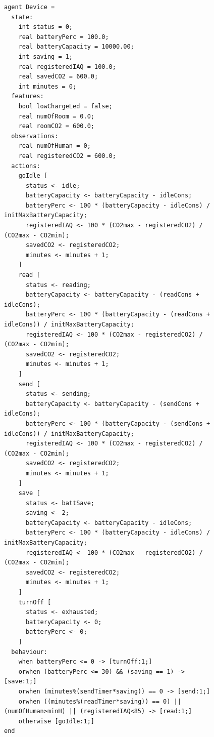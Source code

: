 \documentclass[runningheads]{llncs}
\begin{document}
\begin{figure}[htbp!]
\begin{lstlisting}[language=yoda,basicstyle=\scriptsize, caption={IAQ Scenario: \textsf{Device} agent}, label={lst:deviceagent}]
agent Device =
  state:
    int status = 0;
    real batteryPerc = 100.0;
    real batteryCapacity = 10000.00;
    int saving = 1;
    real registeredIAQ = 100.0;
    real savedCO2 = 600.0;
    int minutes = 0;
  features:
    bool lowChargeLed = false;
    real numOfRoom = 0.0;               
    real roomCO2 = 600.0;
  observations:
    real numOfHuman = 0;     
    real registeredCO2 = 600.0;    
  actions:
    goIdle [
      status <- idle;
      batteryCapacity <- batteryCapacity - idleCons;
      batteryPerc <- 100 * (batteryCapacity - idleCons) / initMaxBatteryCapacity;
      registeredIAQ <- 100 * (CO2max - registeredCO2) / (CO2max - CO2min);
      savedCO2 <- registeredCO2;
      minutes <- minutes + 1;
    ]
    read [
      status <- reading;
      batteryCapacity <- batteryCapacity - (readCons + idleCons);
      batteryPerc <- 100 * (batteryCapacity - (readCons + idleCons)) / initMaxBatteryCapacity;
      registeredIAQ <- 100 * (CO2max - registeredCO2) / (CO2max - CO2min);
      savedCO2 <- registeredCO2;
      minutes <- minutes + 1;
    ]
    send [
      status <- sending;
      batteryCapacity <- batteryCapacity - (sendCons + idleCons);
      batteryPerc <- 100 * (batteryCapacity - (sendCons + idleCons)) / initMaxBatteryCapacity;
      registeredIAQ <- 100 * (CO2max - registeredCO2) / (CO2max - CO2min);
      savedCO2 <- registeredCO2;
      minutes <- minutes + 1;
    ]
    save [
      status <- battSave;
      saving <- 2;
      batteryCapacity <- batteryCapacity - idleCons;
      batteryPerc <- 100 * (batteryCapacity - idleCons) / initMaxBatteryCapacity;
      registeredIAQ <- 100 * (CO2max - registeredCO2) / (CO2max - CO2min);
      savedCO2 <- registeredCO2;
      minutes <- minutes + 1;
    ]
    turnOff [
      status <- exhausted;
      batteryCapacity <- 0;
      batteryPerc <- 0;
    ]
  behaviour:
    when batteryPerc <= 0 -> [turnOff:1;]
    orwhen (batteryPerc <= 30) && (saving == 1) -> [save:1;]
    orwhen (minutes%(sendTimer*saving)) == 0 -> [send:1;]
    orwhen ((minutes%(readTimer*saving)) == 0) || (numOfHuman>minH) || (registeredIAQ<85) -> [read:1;]
    otherwise [goIdle:1;]
end
\end{lstlisting}
\end{figure}
\end{document}
